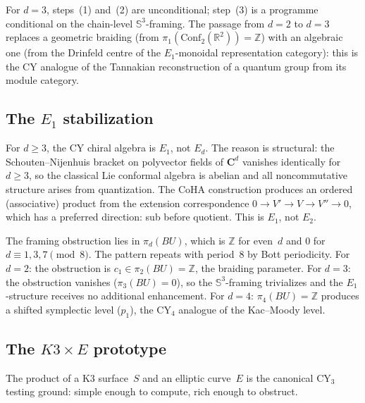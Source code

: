 \documentclass[11pt,reqno]{amsart}
\theoremstyle{definition}
\theoremstyle{remark}
\newcommand{\Conf}{\mathrm{Conf}}
\renewcommand{\Bbbk}{\mathbf{C}}
\numberwithin{equation}{section}
\begin{document}
For $d = 3$, steps~(1) and~(2) are unconditional; step~(3) is
a programme conditional on the chain-level
$\mathbb{S}^3$-framing. The passage from $d = 2$ to $d = 3$
replaces a geometric braiding (from
$\pi_1(\Conf_2(\mathbb{R}^2)) = \mathbb{Z}$) with an
algebraic one (from the Drinfeld centre of the
$E_1$-monoidal representation category): this is the CY
analogue of the Tannakian reconstruction of a quantum group
from its module category.

\subsection{The $E_1$ stabilization}
\label{ssec:e1-stabilization}

For $d \ge 3$, the CY chiral algebra is $E_1$, not $E_d$.
The reason is structural: the Schouten--Nijenhuis bracket on
polyvector fields of $\Bbbk^d$ vanishes identically for
$d \ge 3$, so the classical Lie conformal algebra is abelian
and all noncommutative structure arises from quantization.
The CoHA construction produces an ordered (associative) product
from the extension correspondence
$0 \to V' \to V \to V'' \to 0$, which has a preferred
direction: sub before quotient. This is $E_1$, not $E_2$.

The framing obstruction lies in $\pi_d(BU)$, which is
$\mathbb{Z}$ for even~$d$ and $0$ for $d \equiv 1, 3, 7
\pmod{8}$. The pattern repeats with period~$8$ by Bott
periodicity. For $d = 2$: the obstruction is
$c_1 \in \pi_2(BU) = \mathbb{Z}$, the braiding parameter.
For $d = 3$: the obstruction vanishes
($\pi_3(BU) = 0$), so the $\mathbb{S}^3$-framing trivializes
and the $E_1$-structure receives no additional enhancement.
For $d = 4$: $\pi_4(BU) = \mathbb{Z}$ produces a shifted
symplectic level ($p_1$), the CY$_4$ analogue of the
Kac--Moody level.

\subsection{The $K3 \times E$ prototype}
\label{ssec:k3-times-e}

The product of a K3 surface~$S$ and an elliptic curve~$E$
is the canonical CY$_3$ testing ground: simple enough to
compute, rich enough to obstruct.
\end{document}
